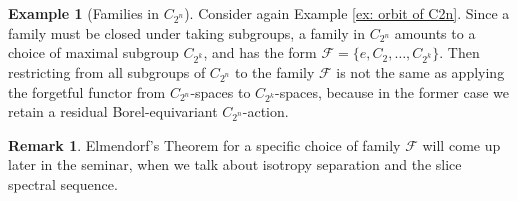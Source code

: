 \documentclass{amsart}
\theoremstyle{definition}
\newtheorem{example}[thm]{Example}
\newtheorem{remark}[thm]{Remark}
\numberwithin{thm}{section}
\def\F{\mathscr{F}}
\begin{document}
\begin{example}[Families in $C_{2^n}$]
    Consider again Example \ref{ex: orbit of C2n}. Since a family must be closed under taking subgroups, a family in $C_{2^n}$ amounts to a choice of maximal subgroup $C_{2^k}$, and has the form $\F = \{e, C_2, \ldots, C_{2^k}\}$. Then restricting from all subgroups of $C_{2^n}$ to the family $\F$ is not the same as applying the forgetful functor from $C_{2^n}$-spaces to $C_{2^k}$-spaces, because in the former case we retain a residual Borel-equivariant $C_{2^n}$-action. 
\end{example}

\begin{remark}
    Elmendorf's Theorem for a specific choice of family $\F$ will come up later in the seminar, when we talk about isotropy separation and the slice spectral sequence. 
\end{remark}

\printbibliography
\end{document}
